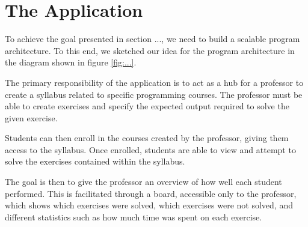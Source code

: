 \chapter{The Application}
To achieve the goal presented in section ..., we need to build a scalable program architecture.
To this end, we sketched our idea for the program architecture in the diagram shown in figure \ref{fig:...}.


The primary responsibility of the application is to act as a hub for a professor to create a syllabus related to specific programming courses.
The professor must be able to create exercises and specify the expected output required to solve the given exercise.

Students can then enroll in the courses created by the professor, giving them access to the syllabus.
Once enrolled, students are able to view and attempt to solve the exercises contained within the syllabus.

The goal is then to give the professor an overview of how well each student performed.
This is facilitated through a board, accessible only to the professor, which shows which exercises were solved, which exercises were not solved, and different statistics such as how much time was spent on each exercise.

